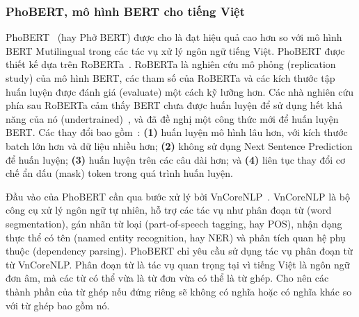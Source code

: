 \subsubsection{PhoBERT, mô hình BERT cho tiếng Việt}
PhoBERT~\cite{nguyenPhoBERTPretrainedLanguage2020} (hay Phở BERT) được cho là
đạt hiệu quả cao hơn so với mô hình BERT Mutilingual trong các tác vụ xử lý
ngôn ngữ tiếng Việt. PhoBERT được thiết kế dựa trên
RoBERTa~\cite{liuRoBERTaRobustlyOptimized2019}. RoBERTa là nghiên cứu mô phỏng
(replication study) của mô hình BERT, các tham số của RoBERTa và các kích thước
tập huấn luyện được đánh giá (evaluate) một cách kỹ lưỡng hơn. Các nhà nghiên
cứu phía sau RoBERTa cảm thấy BERT chưa được huấn luyện để sử dụng hết khả năng
của nó (undertrained)~\cite{liuRoBERTaRobustlyOptimized2019}, và đã đề nghị một
công thức mới để huấn luyện BERT. Các thay đổi bao
gồm~\cite{liuRoBERTaRobustlyOptimized2019}: \textbf{(1)} huấn luyện mô hình lâu
hơn, với kích thước batch lớn hơn và dữ liệu nhiều hơn; \textbf{(2)} không sử
dụng Next Sentence Prediction để huấn luyện; \textbf{(3)} huấn luyện trên các
câu dài hơn; và \textbf{(4)} liên tục thay đổi cơ chế ẩn dấu (mask) token trong
quá trình huấn luyện.

Đầu vào của PhoBERT cần qua bước xử lý bởi
VnCoreNLP~\cite{vuVnCoreNLPVietnameseNatural2018}. VnCoreNLP là bộ công cụ xử
lý ngôn ngữ tự nhiên, hỗ trợ các tác vụ như phân đoạn từ (word segmentation),
gán nhãn từ loại (part-of-speech tagging, hay POS), nhận dạng thực thể có tên
(named entity recognition, hay NER) và phân tích quan hệ phụ thuộc (dependency
parsing). PhoBERT chỉ yêu cầu sử dụng tác vụ phân đoạn từ từ VnCoreNLP. Phân
đoạn từ là tác vụ quan trọng tại vì tiếng Việt là ngôn ngữ đơn âm, mà các từ có
thể vừa là từ đơn vừa có thể là từ ghép. Cho nên các thành phần của từ ghép nếu
đứng riêng sẽ không có nghĩa hoặc có nghĩa khác so với từ ghép bao gồm nó.
